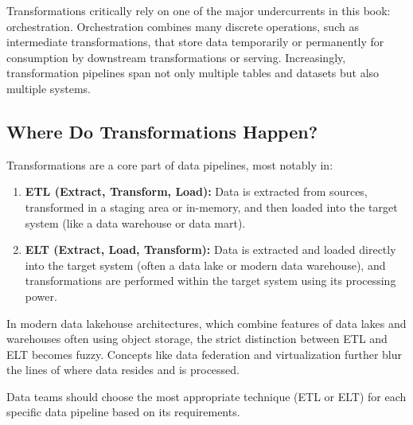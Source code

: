 Transformations critically rely on one of the major undercurrents
in this book: orchestration. Orchestration combines many discrete
operations, such as intermediate transformations, that store data
temporarily or permanently for consumption by downstream
transformations or serving. Increasingly, transformation pipelines
span not only multiple tables and datasets but also multiple systems.



\subsection*{Where Do Transformations Happen?}
Transformations are a core part of data pipelines, most notably in:
\begin{enumerate}
    \item \textbf{ETL (Extract, Transform, Load):}
    Data is extracted from sources, transformed in a staging area
    or in-memory, and then loaded into the target system
    (like a data warehouse or data mart).    

    \item \textbf{ELT (Extract, Load, Transform):} Data is
    extracted and loaded directly into the target system
    (often a data lake or modern data warehouse),
    and transformations are performed within the target
    system using its processing power.
\end{enumerate}

In modern data lakehouse architectures, which combine features of data
lakes and warehouses often using object storage, the strict distinction
between ETL and ELT becomes fuzzy. Concepts like data federation and
virtualization further blur the lines of where data resides and is
processed.

Data teams should choose the most appropriate technique (ETL or ELT)
for each specific data pipeline based on its requirements.




